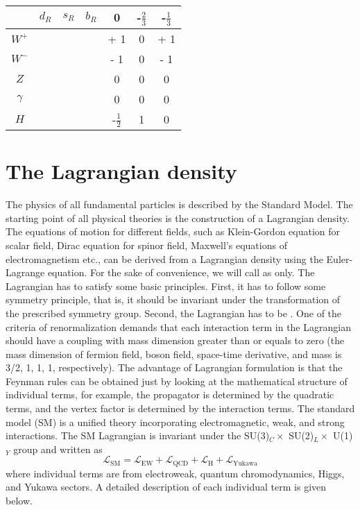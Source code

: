 \begin{table}
\begin{center}
\begin{tabular}{c c c c c c c}
				&$d_R$ & $s_R$ & $b_R$  & 0 & -$\frac{2}{3}$ & -$\frac{1}{3}$\\[0.2cm]\hline
				$W^+$ & & & & + 1 & 0 & + 1 \\[0.2cm]
				$W^-$ & & & & - 1 & 0 & - 1 \\[0.2cm]
				$Z$ & & & & 0 & 0 & 0 \\[0.2cm]
				$\gamma$ & & & & 0 & 0 & 0 \\[0.2cm]
				$H$ & & & & -$\frac{1}{2}$ & 1 & 0 \\[0.2cm]
\hline
\end{tabular}
\end{center}
\end{table}


\section{The Lagrangian density}
\label{s:smLag}
The physics of all fundamental particles is described by the Standard 
Model. The starting point of all physical theories is the 
construction of a Lagrangian density. The equations of motion for 
different fields, such as Klein-Gordon equation for scalar field, Dirac
equation for spinor field, Maxwell's equations of electromagnetism etc., 
can be derived from a Lagrangian density using the Euler-Lagrange equation. For the
sake of convenience, we will call  as  only.
The Lagrangian has to satisfy some basic principles.
First, it has to follow some symmetry principle, that is, it should be invariant under 
the transformation of the prescribed symmetry group. 
Second, the Lagrangian has to be . One 
of the criteria of renormalization demands that each interaction term in the Lagrangian
should have a coupling with mass dimension greater than or equals to zero 
(the mass dimension of fermion field, boson field, space-time derivative, and mass is 
3/2, 1, 1, 1, respectively). The advantage of Lagrangian formulation is that the Feynman 
rules can be obtained just by looking at the mathematical structure of individual terms, 
for example, the propagator is determined by the quadratic terms, and the vertex factor is 
determined by the interaction terms. The standard model (SM) is a unified theory incorporating 
electromagnetic, weak, and strong interactions. The SM Lagrangian is invariant 
under the SU(3)$_C\times$ SU(2)$_L\times$ U(1)$_Y$ group and written as
\begin{equation}
	\mathcal{L}_{\text{SM}} =  \mathcal{L}_\text{EW} + \mathcal{L}_\text{QCD} +
	\mathcal{L}_\text{H} + \mathcal{L}_\text{Yukawa}
  \label{eq:smLag}
\end{equation}
where individual terms are from electroweak, quantum chromodynamics, Higgs, and
Yukawa sectors. A detailed description of each individual term is given below.

